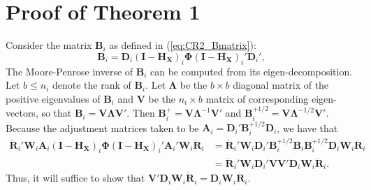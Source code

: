 \documentclass[12pt]{article}
\begin{document}
\hypertarget{app:proof1}{%
\section{Proof of Theorem 1}\label{app:proof1}}

Consider the matrix \(\mathbf{B}_i\) as defined in
(\ref{eq:CR2_Bmatrix}): \[
\mathbf{B}_i = \mathbf{D}_i\left(\mathbf{I} - \mathbf{H_X}\right)_i \boldsymbol\Phi \left(\mathbf{I} - \mathbf{H_X}\right)_i' \mathbf{D}_i',
\] The Moore-Penrose inverse of \(\mathbf{B}_i\) can be computed from
its eigen-decomposition. Let \(b \leq n_i\) denote the rank of
\(\mathbf{B}_i\). Let \(\boldsymbol\Lambda\) be the \(b \times b\)
diagonal matrix of the positive eigenvalues of \(\mathbf{B}_i\) and
\(\mathbf{V}\) be the \(n_i \times b\) matrix of corresponding
eigen-vectors, so that
\(\mathbf{B}_i = \mathbf{V}\boldsymbol\Lambda\mathbf{V}'\). Then
\(\mathbf{B}_i^+ = \mathbf{V}\boldsymbol\Lambda^{-1}\mathbf{V}'\) and
\(\mathbf{B}_i^{+1/2} = \mathbf{V}\boldsymbol\Lambda^{-1/2}\mathbf{V}'\).
Because the adjustment matrices taken to be
\(\mathbf{A}_i = \mathbf{D}_i' \mathbf{B}_i^{+1/2} \mathbf{D}_i\), we
have that \begin{equation}\begin{aligned}
\label{eq:step1}
\mathbf{\ddot{R}}_i' \mathbf{W}_i \mathbf{A}_i \left(\mathbf{I} - \mathbf{H_X}\right)_i \boldsymbol\Phi \left(\mathbf{I} - \mathbf{H_X}\right)_i' \mathbf{A}_i' \mathbf{W}_i \mathbf{\ddot{R}}_i &= \mathbf{\ddot{R}}_i' \mathbf{W}_i \mathbf{D}_i' \mathbf{B}_i^{+1/2} \mathbf{B}_i \mathbf{B}_i^{+1/2} \mathbf{D}_i \mathbf{W}_i \mathbf{\ddot{R}}_i \\
&= \mathbf{\ddot{R}}_i' \mathbf{W}_i \mathbf{D}_i' \mathbf{V}\mathbf{V}' \mathbf{D}_i \mathbf{W}_i \mathbf{\ddot{R}}_i. 
\end{aligned}\end{equation} Thus, it will suffice to show that
\(\mathbf{V}'\mathbf{D}_i \mathbf{W}_i \mathbf{\ddot{R}}_i = \mathbf{D}_i \mathbf{W}_i \mathbf{\ddot{R}}_i\).
\end{document}
